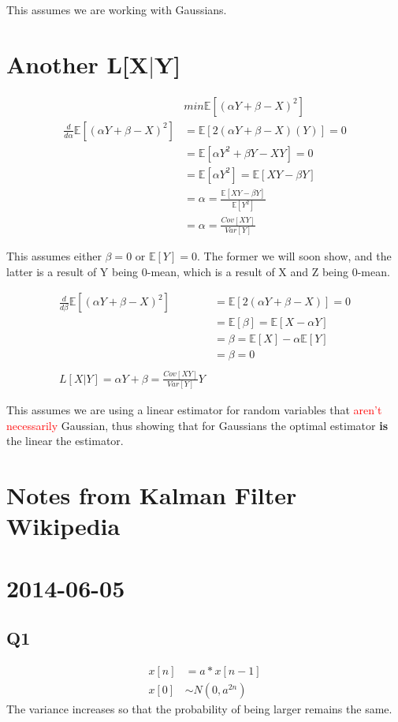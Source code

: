 \documentclass[leqno,twocolumn]{article}
\begin{document}
This assumes we are working with Gaussians.

\section{Another L[X$|$Y]}
\begin{align*}
& min \mathbb{E}[(\alpha Y + \beta - X)^2]\\
\frac{d}{d\alpha} \mathbb{E}[(\alpha Y + \beta - X)^2] &= \mathbb{E}[2(\alpha Y + \beta - X)(Y)] = 0\\
&= \mathbb{E}[\alpha Y^2 + \beta Y - XY] = 0\\
&= \mathbb{E}[\alpha Y^2] = \mathbb{E}[XY - \beta Y]\\
&= \alpha = \frac{\mathbb{E}[XY-\beta Y]}{\mathbb{E}[Y^2]}\\
&= \alpha = \frac{Cov[XY]}{Var[Y]}
\end{align*}

This assumes either $\beta = 0$ or $\mathbb{E}[Y] = 0$. The former we will soon show, and the latter is a result of Y being 0-mean, which is a result of X and Z being 0-mean.

\begin{align*}
\frac{d}{d\beta} \mathbb{E}[(\alpha Y + \beta - X)^2] &= \mathbb{E}[2(\alpha Y+\beta-X)] = 0\\
&= \mathbb{E}[\beta] = \mathbb{E}[X-\alpha Y]\\
&= \beta = \mathbb{E}[X] - \alpha\mathbb{E}[Y]\\
&= \beta = 0\\
\\
L[X|Y] = \alpha Y + \beta = \frac{Cov[XY]}{Var[Y]}Y
\end{align*}

This assumes we are using a linear estimator for random variables that \textcolor{red}{aren't necessarily} Gaussian, thus showing that for Gaussians the optimal estimator \textbf{is} the linear the estimator.

\section{Notes from Kalman Filter Wikipedia}

\section{2014-06-05}
\subsection{Q1}
\begin{align*}
x[n] &= a*x[n-1]\\
x[0] &\sim N(0,a^{2n})
\end{align*}
The variance increases so that the probability of being larger remains the same.
\end{document}
